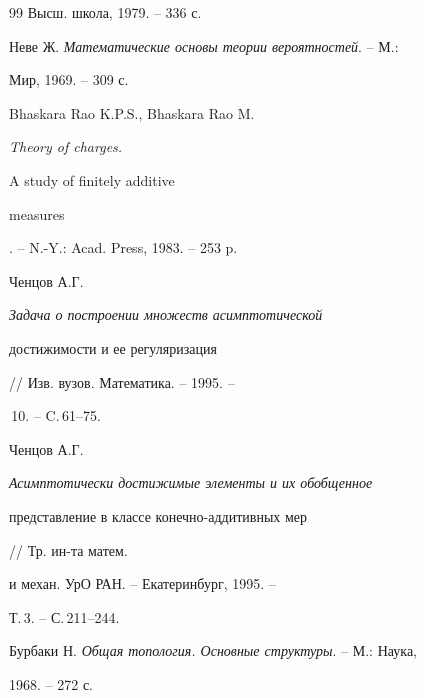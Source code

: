 \begin{thebibliography}{99}
Высш. школа, 1979. -- 336 с.




Неве Ж. {\em Математические основы теории вероятностей}. -- М.:


Мир, 1969. -- 309 с.




Bhaskara Rao K.P.S., Bhaskara Rao M. {\em Theory of charges.


A study of finitely additive


measures}. -- N.-Y.: Acad. Press, 1983. -- 253 p.




Ченцов А.Г. {\em Задача о построении множеств асимптотической


достижимости и ее регуляризация} // Изв. вузов. Математика. -- 1995. --


\No\,10. -- C.\,61--75.




Ченцов А.Г. {\em Асимптотически достижимые элементы и их обобщенное


представление в классе конечно-аддитивных мер} // Тр. ин-та матем.


и механ. УрО РАН. -- Екатеринбург, 1995. --


Т.\,3. -- С.\,211--244.




Бурбаки Н. {\em Общая топология. Основные структуры}. -- М.: Наука,


1968. -- 272 с.





\end{thebibliography}





\vskip 2cm














\label{end}






